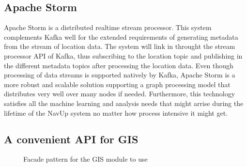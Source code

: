 \subsection{Apache Storm}
Apache Storm is a distributed realtime stream processor. This system complements Kafka well for the extended requirements of generating metadata from the stream of location data. The system will link in throught the stream processor API of Kafka, thus subscribing to the location topic and publishing in the different metadata topics after processing the location data. Even though processing of data streams is supported natively by Kafka, Apache Storm is a more robust and scalable solution supporting a graph processing model that distributes very well over many nodes if needed. Furthermore, this technology satisfies all the machine learning and analysis needs that might arrise during the lifetime of the NavUp system no matter how process intensive it might get.

\subsection{A convenient API for GIS}
\begin{figure}[h]
\caption{Facade pattern for the GIS module to use}
\end{figure}

